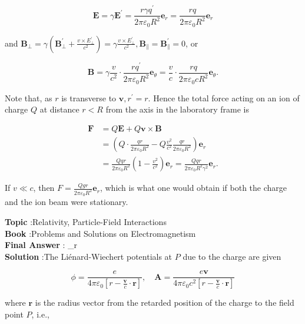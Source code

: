 \documentclass[10pt]{article}
\begin{document}
$$
\mathbf{E}=\gamma \mathbf{E}^{\prime}=\frac{r \gamma q^{\prime}}{2 \pi \varepsilon_{0} R^{2}} \mathbf{e}_{r}=\frac{r q}{2 \pi \varepsilon_{0} R^{2}} \mathbf{e}_{r}
$$

and $\mathbf{B}_{\perp}=\gamma\left(\mathbf{B}_{\perp}^{\prime}+\frac{v \times E_{\perp}^{\prime}}{c^{2}}\right)=\gamma \frac{v \times E_{\perp}^{\prime}}{c^{2}}, \mathbf{B}_{\|}=\mathbf{B}_{\|}^{\prime}=0$, or

$$
\mathbf{B}=\gamma \frac{v}{c^{2}} \cdot \frac{r q^{\prime}}{2 \pi \varepsilon_{0} R^{2}} \mathbf{e}_{\theta}=\frac{v}{c} \cdot \frac{r q}{2 \pi \varepsilon_{0} c R^{2}} \mathbf{e}_{\theta} .
$$

Note that, as $r$ is transverse to $\mathbf{v}, r^{\prime}=r$. Hence the total force acting on an ion of charge $Q$ at distance $r<R$ from the axis in the laboratory frame is

$$
\begin{aligned}
\mathbf{F} &=Q \mathbf{E}+Q \mathbf{v} \times \mathbf{B} \\
&=\left(Q \cdot \frac{q r}{2 \pi \varepsilon_{0} R^{2}}-Q \frac{v^{2}}{c^{2}} \frac{q r}{2 \pi \varepsilon_{0} R^{2}}\right) \mathbf{e}_{r} \\
&=\frac{Q q r}{2 \pi \varepsilon_{0} R^{2}}\left(1-\frac{v^{2}}{c^{2}}\right) \mathbf{e}_{r}=\frac{Q q r}{2 \pi \varepsilon_{0} R^{2} \gamma^{2}} \mathbf{e}_{r} .
\end{aligned}
$$

If $v \ll c$, then $F=\frac{Q g r}{2 \pi \varepsilon_{0} R^{2}} \mathbf{e}_{r}$, which is what one would obtain if both the charge and the ion beam were stationary.

\textbf{Topic} :Relativity, Particle-Field Interactions\\
\textbf{Book} :Problems and Solutions on Electromagnetism\\
\textbf{Final Answer} : _{r}\\


\textbf{Solution} :The Liénard-Wiechert potentials at $P$ due to the charge are given

$$
\phi=\frac{e}{4 \pi \varepsilon_{0}\left[r-\frac{\mathbf{v}}{c} \cdot \mathbf{r}\right]}, \quad \mathbf{A}=\frac{e \mathbf{v}}{4 \pi \varepsilon_{0} c^{2}\left[r-\frac{\mathbf{v}}{c} \cdot \mathbf{r}\right]}
$$

where $\mathbf{r}$ is the radius vector from the retarded position of the charge to the field point $P$, i.e.,
\end{document}
